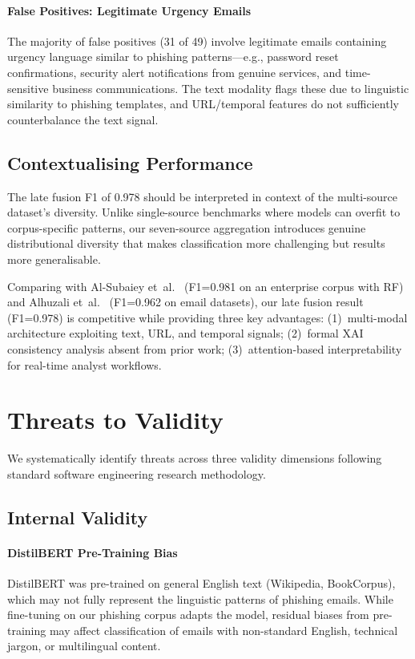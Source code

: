 \documentclass[conference]{IEEEtran}
\begin{document}
\paragraph{False Positives: Legitimate Urgency Emails}
The majority of false positives (31 of 49) involve legitimate emails
containing urgency language similar to phishing patterns---e.g., password
reset confirmations, security alert notifications from genuine services,
and time-sensitive business communications. The text modality flags these
due to linguistic similarity to phishing templates, and URL/temporal
features do not sufficiently counterbalance the text signal.

\subsection{Contextualising Performance}
\label{subsec:context}

The late fusion F1 of 0.978 should be interpreted in context of the
multi-source dataset's diversity. Unlike single-source benchmarks where
models can overfit to corpus-specific patterns, our seven-source
aggregation introduces genuine distributional diversity that makes
classification more challenging but results more generalisable.

Comparing with Al-Subaiey et~al.~\cite{alsubaiey2024} (F1=0.981 on an
enterprise corpus with RF) and Alhuzali et~al.~\cite{alhuzali2025}
(F1=0.962 on email datasets), our late fusion result (F1=0.978) is
competitive while providing three key advantages: (1)~multi-modal
architecture exploiting text, URL, and temporal signals; (2)~formal
XAI consistency analysis absent from prior work; (3)~attention-based
interpretability for real-time analyst workflows.

\section{Threats to Validity}
\label{sec:threats}

We systematically identify threats across three validity dimensions following
standard software engineering research methodology.

\subsection{Internal Validity}
\label{subsec:internal_threats}

\paragraph{DistilBERT Pre-Training Bias}
DistilBERT was pre-trained on general English text (Wikipedia, BookCorpus),
which may not fully represent the linguistic patterns of phishing emails.
While fine-tuning on our phishing corpus adapts the model, residual biases
from pre-training may affect classification of emails with non-standard
English, technical jargon, or multilingual content.
\end{document}
